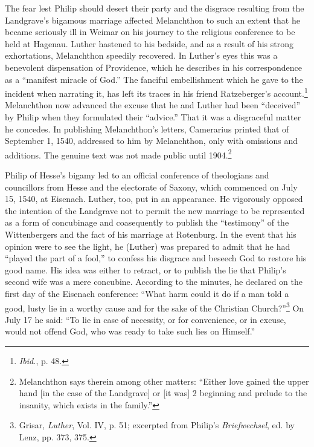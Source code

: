The fear lest Philip should desert their party and the disgrace resulting
from the Landgrave’s bigamous marriage affected Melanchthon to such an
extent that he became seriously ill in Weimar on
his journey to the religious conference to be held at Hagenau. Luther
hastened to his bedside, and as a result of his strong exhortations,
Melanchthon speedily recovered. In Luther’s eyes this was a benevolent
dispensation of Providence, which he describes in his correspondence
as a “manifest miracle of God.” The fanciful embellishment which
he gave to the incident when narrating it, has left its traces in his
friend Ratzeberger’s account.\footnote{\textit{Ibid.}, p. 48.}
Melanchthon now advanced the excuse
that he and Luther had been “deceived” by Philip when they
formulated their “advice.” That it was a disgraceful matter he concedes.
In publishing Melanchthon’s letters, Camerarius printed that
of September 1, 1540, addressed to him by Melanchthon, only with
omissions and additions. The genuine text was not made public
until 1904.\footnote
{Melanchthon says therein among other matters: “Either love gained the upper hand
[in the case of the Landgrave] or [it was] 2 beginning and prelude to the insanity, which
exists in the family.”}

Philip of Hesse’s bigamy led to an official conference of theologians
and councillors from Hesse and the electorate of Saxony,
which commenced on July 15, 1540, at Eisenach. Luther, too, put in
an appearance. He vigorously opposed the intention of the Landgrave
not to permit the new marriage to be represented as a form of concubinage
and coasequently to publish the “testimony” of the Wittenbergers and the
fact of his marriage at Rotenburg. In the event that his
opinion were to see the light, he (Luther) was prepared to admit that
he had “played the part of a fool,” to confess his disgrace and beseech
God to restore his good name. His idea was either to retract, or
to publish the lie that Philip’s second wife was a mere concubine. According
to the minutes, he declared on the first day of the Eisenach
conference: “What harm could it do if a man told a good, lusty lie
in a worthy cause and for the sake of the Christian Church?”\footnote
{Grisar, \textit{Luther}, Vol. IV, p. 51; excerpted from Philip’s \textit{Briefwechsel}, ed. by Lenz, pp.
373, 375.}
On July 17 he said: “To lie in case of necessity, or for convenience, or in
excuse, would not offend God, who was ready to take such lies on
Himself.”


